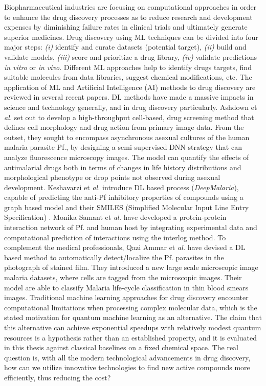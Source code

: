 Biopharmaceutical industries are focusing on computational approaches in order to enhance the drug discovery processes as to reduce research and development expenses by diminishing failure rates in clinical trials and ultimately generate superior medicines. Drug discovery using ML techniques can be divided into four major steps: \emph{(i)} identify and curate datasets (potential target), \emph{(ii)} build and validate models, \emph{(iii)} score and prioritize a drug library, \emph{(iv)} validate predictions \emph{in vitro} or \emph{in vivo}. Different ML approaches help to identify drugs targets, find suitable molecules from data libraries, suggest chemical modifications, etc. The application of ML and Artificial Intelligence (AI) methods to drug discovery are reviewed in several recent papers. DL methods have made a massive impacts in science and technology generally, and in drug discovery particularly. Ashdown et \emph{al.} \cite{Ashdown2020} set out to develop a high-throughput cell-based, drug screening method that defines cell morphology and drug action from primary image data. From the outset, they sought to encompass asynchronous asexual cultures of the human malaria parasite Pf., by designing a semi-supervised DNN strategy that can analyze fluorescence microscopy images. The model can quantify the effects of antimalarial drugs both in terms of changes in life history distributions and morphological phenotype or drop points not observed during asexual development. Keshavarzi et \emph{al.} \cite{KeshavarziArshadi2020} introduce DL based process (\emph{DeepMalaria}), capable of predicting the anti-Pf inhibitory properties of compounds using a graph based model and their SMILES (Simplified Molecular Input Line Entry Specification) \cite{Weininger1988,Honda2019}. Monika Samant et \emph{al.} \cite{SamantMonika2016} have developed a protein-protein interaction network of Pf. and human host by integrating experimental data and computational prediction of interactions using the interlog method. To complement the medical professionals, Qazi Ammar et \emph{al.} \cite{Arshad2021} have devised a DL based method to automatically detect/localize the Pf. parasites in the photograph of stained film. They introduced a new large scale microscopic image malaria datasets, where cells are tagged from the microscopic images. Their model are able to classify Malaria life-cycle classification in thin blood smears images. Traditional machine learning approaches for drug discovery encounter computational limitations when processing complex molecular data, which is the stated motivation for quantum machine learning as an alternative. The claim that this alternative can achieve exponential speedups with relatively modest quantum resources is a hypothesis rather than an established property, and it is evaluated in this thesis against classical baselines on a fixed chemical space. The real question is, with all the modern technological advancements in drug discovery, how can we utilize innovative technologies to find new active compounds more efficiently, thus reducing the cost?

